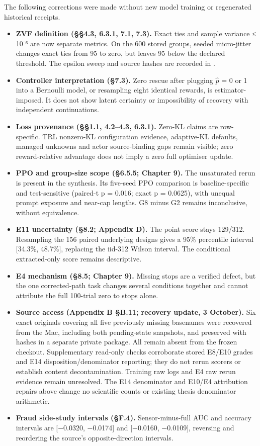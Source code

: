 \documentclass[12pt,a4paper]{report}
\DeclareRobustCommand{\longtok}[1]{\texttt{\seqsplit{#1}}}
\providecommand{\tightlist}{%
  \setlength{\itemsep}{0pt}\setlength{\parskip}{0pt}}
\begin{document}
The following corrections were made without new model training or
regenerated historical receipts.

\begin{itemize}
\tightlist
\item
  \textbf{ZVF definition (§§4.3, 6.3.1, 7.1, 7.3).} Exact ties and
  sample variance ≤ 10⁻⁶ are now separate metrics. On the 600 stored
  groups, seeded micro-jitter changes exact ties from 95 to zero, but
  leaves 95 below the declared threshold. The epsilon sweep and source
  hashes are recorded in
  \longtok{pcd\_\allowbreak{}vs\_\allowbreak{}zvf\_\allowbreak{}tolerance\_\allowbreak{}analysis.json}.
\item
  \textbf{Controller interpretation (§7.3).} Zero rescue after plugging
  \ensuremath{\hat{p}} = 0 or 1 into a Bernoulli model, or resampling eight identical
  rewards, is estimator-imposed. It does not show latent certainty or
  impossibility of recovery with independent continuations.
\item
  \textbf{Loss provenance (§§1.1, 4.2--4.3, 6.3.1).} Zero-KL claims are
  row-specific. TRL nonzero-KL configuration evidence, adaptive-KL
  defaults, managed unknowns and actor source-binding gaps remain
  visible; zero reward-relative advantage does not imply a zero full
  optimiser update.
\item
  \textbf{PPO and group-size scope (§6.5.5; Chapter 9).} The unsaturated
  rerun is present in the synthesis. Its five-seed PPO comparison is
  baseline-specific and test-sensitive (paired-t p = 0.016; exact p =
  0.0625), with unequal prompt exposure and near-cap lengths. G8 minus
  G2 remains inconclusive, without equivalence.
\item
  \textbf{E11 uncertainty (§8.2; Appendix D).} The point score stays
  129/312. Resampling the 156 paired underlying designs gives a 95\%
  percentile interval {[}34.3\%, 48.7\%{]}, replacing the iid-312 Wilson
  interval. The conditional extracted-only score remains descriptive.
\item
  \textbf{E4 mechanism (§8.5; Chapter 9).} Missing stops are a verified
  defect, but the one corrected-path task changes several conditions
  together and cannot attribute the full 100-trial zero to stops alone.
\item
  \textbf{Source access (Appendix B §B.11; recovery update, 3 October).}
  Six exact originals covering all five previously missing basenames
  were recovered from the Mac, including both pending-state snapshots,
  and preserved with hashes in a separate private package. All remain
  absent from the frozen checkout. Supplementary read-only checks
  corroborate stored E8/E10 grades and E14 disposition/denominator
  reporting; they do not rerun scorers or establish content
  decontamination. Training raw logs and E4 raw rerun evidence remain
  unresolved. The E14 denominator and E10/E4 attribution repairs above
  change no scientific counts or existing thesis denominator arithmetic.
\item
  \textbf{Fraud side-study intervals (§F.4).} Sensor-minus-full AUC and
  accuracy intervals are {[}−0.0320, −0.0174{]} and {[}−0.0160,
  −0.0109{]}, reversing and reordering the source's opposite-direction
  intervals.
\end{itemize}
\end{document}
